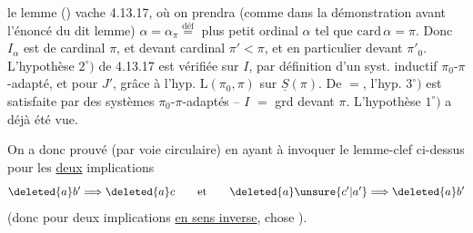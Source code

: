 
le lemme () vache 4.13.17, où on prendra (comme dans la démonstration  avant l'énoncé du dit lemme)
$\alpha=\alpha_\pi\overset{\text{déf}}{=}$ plus petit ordinal $\alpha$ tel que $\mathrm{card}\,\alpha=\pi$. Donc $I_\alpha$ est de cardinal $\pi$, et  devant  cardinal $\pi'<\pi$, et en particulier devant $\pi'_0$. L'hypothèse $2^\circ)$ de 4.13.17 est vérifiée sur $I$, par définition d'un syst. inductif $\pi_0$-$\pi$-adapté, et pour $J'$, grâce à l'hyp. $\mathrm L(\pi_0,\pi)$ sur $\underline S(\pi)$. De $=$, l'hyp. $3^\circ)$  est satisfaite par  des systèmes $\pi_0$-$\pi$-adaptés -- $I$  $=$ grd devant $\pi$. L'hypothèse $1^\circ)$ a déjà été vue.

On a donc prouvé (par voie circulaire)
en ayant à invoquer le lemme-clef ci-dessus pour les \uline{deux} implications
\[
 \deleted{a}b'\Longrightarrow\deleted{a}c\qquad\text{et}\qquad\deleted{a}\unsure{c'|a'}\Longrightarrow\deleted{a}b'
\]
(donc pour deux implications \uline{en sens inverse}, chose  \unsure{\ldots}).


